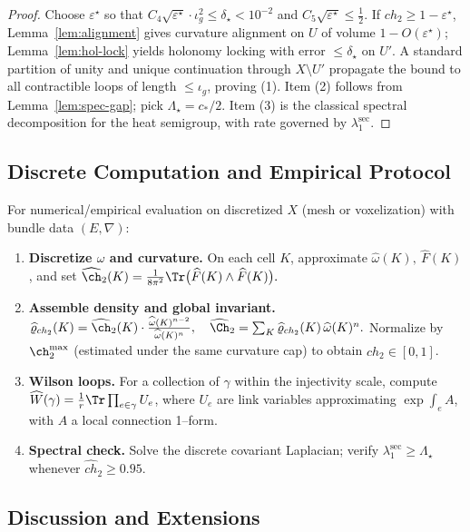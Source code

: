 \begin{proof}
Choose $\varepsilon^\star$ so that $C_4\sqrt{\varepsilon^\star}\cdot \iota_g^2\le \delta_\star<10^{-2}$ and $C_5\sqrt{\varepsilon^\star}\le \tfrac{1}{2}$.
If $ch_2\ge 1-\varepsilon^\star$, Lemma~\ref{lem:alignment} gives curvature alignment on $U$ of volume $1-O(\varepsilon^\star)$; Lemma~\ref{lem:hol-lock} yields holonomy locking with error $\le \delta_\star$ on $U'$.
A standard partition of unity and unique continuation through $X\setminus U'$ propagate the bound to all contractible loops of length $\le \iota_g$, proving (1).
Item (2) follows from Lemma~\ref{lem:spec-gap}; pick $\Lambda_\star=c_\ast/2$.
Item (3) is the classical spectral decomposition for the heat semigroup, with rate governed by $\lambda_1^\mathrm{sec}$.
\end{proof}

\subsection{Discrete Computation and Empirical Protocol}

For numerical/empirical evaluation on discretized $X$ (mesh or voxelization) with bundle data $(E,\nabla)$:

\begin{enumerate}
\item \textbf{Discretize $\omega$ and curvature.} On each cell $K$, approximate
$
\widehat{\omega}(K),\ \widehat{F}(K)
$,
and set
$
\widehat{\ch}_2(K)=\frac{1}{8\pi^2}\Tr\big(\widehat{F}(K)\wedge \widehat{F}(K)\big).
$
\item \textbf{Assemble density and global invariant.}
$
\widehat{\varrho}_{ch_2}(K)=\widehat{\ch}_2(K)\cdot \frac{\widehat{\omega}(K)^{n-2}}{\widehat{\omega}(K)^{n}},
\quad
\widehat{\Ch}_2=\sum_K \widehat{\varrho}_{ch_2}(K)\,\widehat{\omega}(K)^{n}.
$
Normalize by $\ch_2^{\max}$ (estimated under the same curvature cap) to obtain $\widehat{ch}_2\in[0,1]$.
\item \textbf{Wilson loops.} For a collection of $\gamma$ within the injectivity scale, compute
$
\widehat{W}(\gamma)=\frac{1}{r}\Tr\prod_{e\in\gamma}U_e
$,
where $U_e$ are link variables approximating $\exp\!\int_e A$, with $A$ a local connection 1--form.
\item \textbf{Spectral check.} Solve the discrete covariant Laplacian; verify $\lambda_1^\mathrm{sec}\ge \Lambda_\star$ whenever $\widehat{ch}_2\ge 0.95$.
\end{enumerate}

\subsection{Discussion and Extensions}

